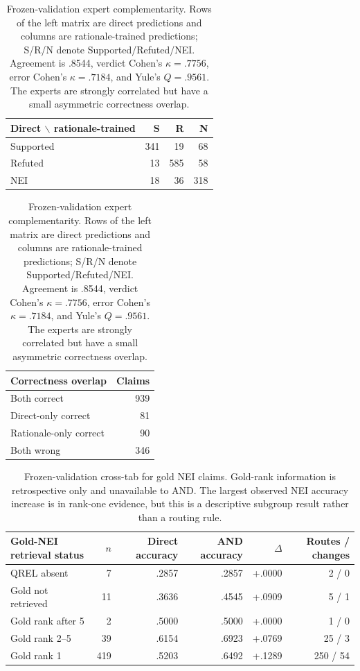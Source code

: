 \documentclass[11pt]{article}
\begin{document}
\begin{table}[t]
\centering\small
\begin{minipage}[t]{.48\textwidth}
\centering
\begin{tabular}{@{}lrrr@{}}
\toprule
Direct $\backslash$ rationale-trained & S & R & N\\
\midrule
Supported & 341 & 19 & 68\\
Refuted & 13 & 585 & 58\\
\textsc{NEI} & 18 & 36 & 318\\
\bottomrule
\end{tabular}
\end{minipage}\hfill
\begin{minipage}[t]{.46\textwidth}
\centering
\begin{tabular}{@{}lr@{}}
\toprule
Correctness overlap & Claims\\
\midrule
Both correct & 939\\
Direct-only correct & 81\\
Rationale-only correct & 90\\
Both wrong & 346\\
\bottomrule
\end{tabular}
\end{minipage}
\caption{Frozen-validation expert complementarity. Rows of the left matrix are direct predictions and columns are rationale-trained predictions; S/R/N denote Supported/Refuted/\textsc{NEI}. Agreement is .8544, verdict Cohen's $\kappa=.7756$, error Cohen's $\kappa=.7184$, and Yule's $Q=.9561$. The experts are strongly correlated but have a small asymmetric correctness overlap.}\label{tab:expert-complementarity}
\end{table}

\begin{table}[t]
\centering\small
\begin{tabular}{@{}lrrrrr@{}}
\toprule
Gold-\textsc{NEI} retrieval status & $n$ & Direct accuracy & AND accuracy & $\Delta$ & Routes / changes\\
\midrule
QREL absent & 7 & .2857 & .2857 & +.0000 & 2 / 0\\
Gold not retrieved & 11 & .3636 & .4545 & +.0909 & 5 / 1\\
Gold rank after 5 & 2 & .5000 & .5000 & +.0000 & 1 / 0\\
Gold rank 2--5 & 39 & .6154 & .6923 & +.0769 & 25 / 3\\
Gold rank 1 & 419 & .5203 & .6492 & +.1289 & 250 / 54\\
\bottomrule
\end{tabular}
\caption{Frozen-validation cross-tab for gold \textsc{NEI} claims. Gold-rank information is retrospective only and unavailable to AND. The largest observed NEI accuracy increase is in rank-one evidence, but this is a descriptive subgroup result rather than a routing rule.}\label{tab:nei-rank-cross-tab}
\end{table}
\end{document}

